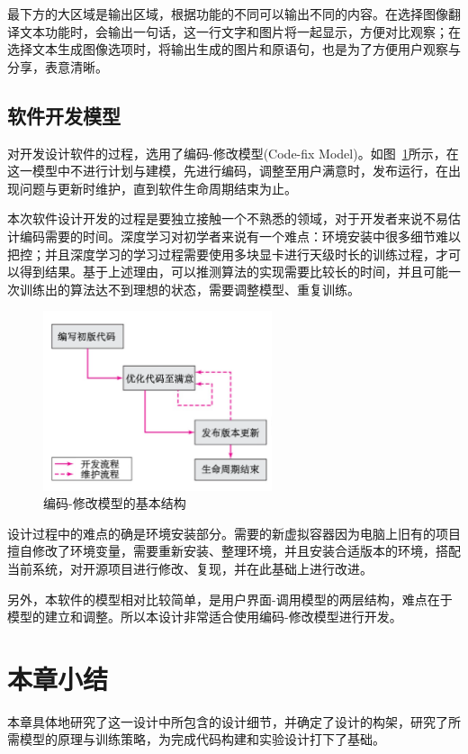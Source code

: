   最下方的大区域是输出区域，根据功能的不同可以输出不同的内容。在选择图像翻译文本功能时，会输出一句话，这一行文字和图片将一起显示，方便对比观察；在选择文本生成图像选项时，将输出生成的图片和原语句，也是为了方便用户观察与分享，表意清晰。

\subsection{软件开发模型}
对开发设计软件的过程，选用了编码-修改模型(Code-fix Model)。如图~\ref{fig:codenfix}所示，在这一模型中不进行计划与建模，先进行编码，调整至用户满意时，发布运行，在出现问题与更新时维护，直到软件生命周期结束为止。

本次软件设计开发的过程是要独立接触一个不熟悉的领域，对于开发者来说不易估计编码需要的时间。深度学习对初学者来说有一个难点：环境安装中很多细节难以把控；并且深度学习的学习过程需要使用多块显卡进行天级时长的训练过程，才可以得到结果。基于上述理由，可以推测算法的实现需要比较长的时间，并且可能一次训练出的算法达不到理想的状态，需要调整模型、重复训练。

\begin{figure}[!htb]
    \centering
    \includegraphics[width=0.6\textwidth]{figures/codeandfix.png}
    \caption{编码-修改模型的基本结构}
    \label{fig:codenfix}
\end{figure}

设计过程中的难点的确是环境安装部分。需要的新虚拟容器因为电脑上旧有的项目擅自修改了环境变量，需要重新安装、整理环境，并且安装合适版本的环境，搭配当前系统，对开源项目进行修改、复现，并在此基础上进行改进。

另外，本软件的模型相对比较简单，是用户界面-调用模型的两层结构，难点在于模型的建立和调整。所以本设计非常适合使用编码-修改模型进行开发。



\section{本章小结}
本章具体地研究了这一设计中所包含的设计细节，并确定了设计的构架，研究了所需模型的原理与训练策略，为完成代码构建和实验设计打下了基础。

